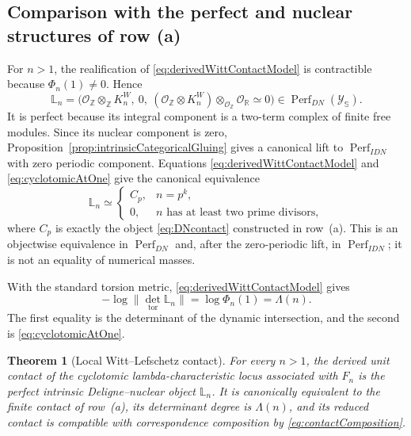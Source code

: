 \documentclass[11pt]{amsart}
\newtheorem{theorem}{Theorem}[section]
\theoremstyle{definition}
\theoremstyle{remark}
\newcommand{\R}{\mathbb R}
\newcommand{\Z}{\mathbb Z}
\begin{document}
\subsection{Comparison with the perfect and nuclear structures of row (a)}

For $n>1$, the realification of \eqref{eq:derivedWittContactModel} is
contractible because $\Phi_n(1)\ne0$.  Hence
\begin{equation}\label{eq:DNLefschetzComplex}
 \mathbb L_n=
 \bigl(\mathcal O_{\Z}\otimes_\Z K_n^W,\ 0,\
 (\mathcal O_{\Z}\otimes K_n^W)\otimes_{\mathcal O_{\Z}}
 \mathcal O_{\R}\simeq0\bigr)
 \in\operatorname{Perf}_{DN}(\mathscr Y_{\mathbb S}).
\end{equation}
It is perfect because its integral component is a two-term complex of
finite free modules.  Since its nuclear component is zero,
Proposition~\ref{prop:intrinsicCategoricalGluing} gives a canonical lift to
$\operatorname{Perf}_{IDN}$ with zero periodic component.  Equations
\eqref{eq:derivedWittContactModel} and \eqref{eq:cyclotomicAtOne} give the
canonical equivalence
\begin{equation}\label{eq:contactComparisonA}
 \mathbb L_n\simeq
 \begin{cases}
  C_p,&n=p^k,\\
  0,&n\text{ has at least two prime divisors},
 \end{cases}
\end{equation}
where $C_p$ is exactly the object \eqref{eq:DNcontact} constructed in
row~(a).  This is an objectwise equivalence in
$\operatorname{Perf}_{DN}$ and, after the zero-periodic lift, in
$\operatorname{Perf}_{IDN}$; it is not an equality of numerical masses.

With the standard torsion metric, \eqref{eq:derivedWittContactModel} gives
\begin{equation}\label{eq:contactdegreeagain}
 -\log\|\det_{\mathrm{tor}}\mathbb L_n\|
 =\log\Phi_n(1)=\Lambda(n).
\end{equation}
The first equality is the determinant of the dynamic intersection, and the
second is \eqref{eq:cyclotomicAtOne}.

\begin{theorem}[Local Witt--Lefschetz contact]\label{thm:rowbcontact}
For every $n>1$, the derived unit contact of the cyclotomic
lambda-characteristic locus associated with $F_n$ is
the perfect intrinsic Deligne--nuclear object $\mathbb L_n$.  It is canonically
equivalent to the finite contact of row~(a), its determinant degree is
$\Lambda(n)$, and its reduced contact is compatible with correspondence
composition by \eqref{eq:contactComposition}.
\end{theorem}
\end{document}

